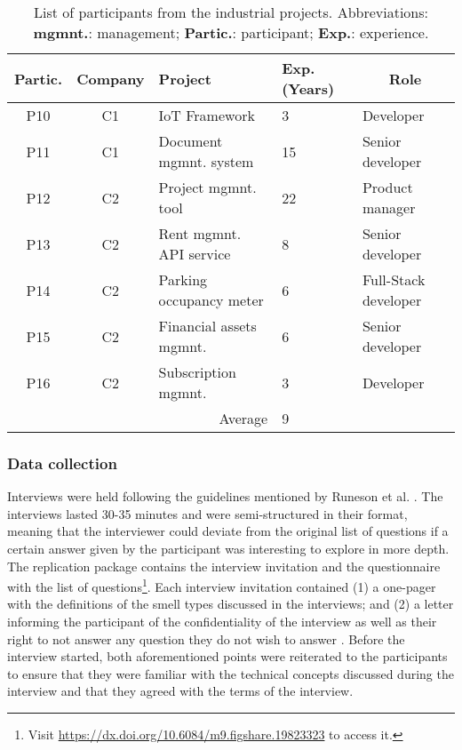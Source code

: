 \begin{table}[]
    \centering
   \footnotesize
    \caption{List of participants from the industrial projects. Abbreviations: \textbf{mgmnt.}: management; \textbf{Partic.}: participant; \textbf{Exp.}: experience.}
    \label{c6:tab:industrial-participants}
    \begin{tabular}{@{}ccm{2cm}m{0.5cm}l@{}}
    \toprule
    \textbf{Partic.} & \textbf{Company} & \textbf{Project} & \textbf{Exp. (Years)} & \multicolumn{1}{c}{\textbf{Role}} \\ \midrule
    P10 & C1 & IoT Framework & 3 & Developer \\ %
    P11 & C1 & Document mgmnt. system & 15 & Senior developer \\ %
    P12 & C2 & Project mgmnt. tool & 22 & Product manager\\ %
    P13 & C2 & Rent mgmnt. API service & 8 & Senior developer \\ %
    P14 & C2 & Parking occupancy meter & 6 & Full-Stack developer \\ %
    P15 & C2 & Financial assets mgmnt. & 6 & Senior developer \\ %
    P16 & C2 & Subscription mgmnt. & 3 & Developer \\ \midrule %
    \multicolumn{3}{r}{Average} & 9 &  \\ \bottomrule
    \end{tabular}
\end{table}

\subsubsection{Data collection}
Interviews were held following the guidelines mentioned by Runeson et al. \cite{Runeson2012}.
The interviews lasted 30-35 minutes and were semi-structured in their format, meaning that the interviewer could deviate from the original list of questions if a certain answer given by the participant was interesting to explore in more depth. The replication package contains the interview invitation and the questionnaire with the list of questions\footnote{Visit \url{https://dx.doi.org/10.6084/m9.figshare.19823323} to access it.}.
Each interview invitation contained (1) a one-pager with the definitions of the smell types discussed in the interviews; and (2) a letter informing the participant of the confidentiality of the interview as well as their right to not answer any question they do not wish to answer \cite{Runeson2012}.
Before the interview started, both aforementioned points were reiterated to the participants to ensure that they were familiar with the technical concepts discussed during the interview and that they agreed with the terms of the interview.
 
